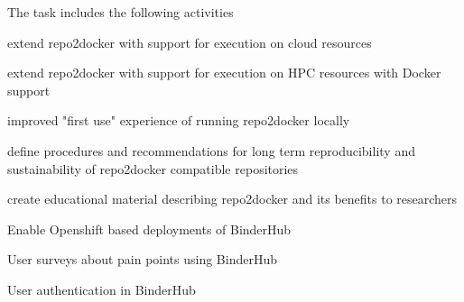 \documentclass[
  deliverables,
  longtasklabels,
  noworkareas,
  svgnames,
  \classoptions
]{euproposal}       %
\begin{document}
\begin{draft}


  The task includes the following activities
  \begin{compactitem}
  \item extend repo2docker with support for execution on cloud resources
  \item extend repo2docker with support for execution on HPC resources with Docker support
  \item improved "first use" experience of running repo2docker locally
  \item define procedures and recommendations for long term reproducibility and sustainability of repo2docker compatible repositories
  \item create educational material describing repo2docker and its benefits to researchers
  \item Enable Openshift based deployments of BinderHub
  \item User surveys about pain points using BinderHub
  \item User authentication in BinderHub
  \end{compactitem}
  \end{draft}
\end{document}
